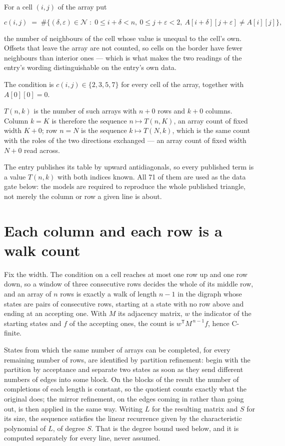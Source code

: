 \documentclass[11pt]{article}
\theoremstyle{definition}
\begin{document}
For a cell $(i,j)$ of the array put

\[c(i,j) \;=\; \#\bigl\{(\delta,\varepsilon)\in\mathcal{N} \;:\; 0\le i+\delta<n,\ 0\le j+\varepsilon<2,\ A[i+\delta][j+\varepsilon] \neq A[i][j]\bigr\},\]

the number of neighbours of the cell whose value is unequal to the cell's own. Offsets that leave the array are not counted, so cells on the border have fewer neighbours than interior ones --- which is what makes the two readings of the entry's wording distinguishable on the entry's own data.

The condition is $c(i,j) \in \{2, 3, 5, 7\}$ for every cell of the array, together with $A[0][0]=0$.

$T(n,k)$ is the number of such arrays with $n + 0$ rows and $k + 0$ columns. Column $k = K$ is therefore the sequence $n \mapsto T(n,K)$, an array count of fixed width $K + 0$; row $n = N$ is the sequence $k \mapsto T(N,k)$, which is the same count with the roles of the two directions exchanged --- an array count of fixed width $N + 0$ read across.

The entry publishes its table by upward antidiagonals, so every published term is a value $T(n,k)$ with both indices known. All 71 of them are used as the data gate below: the models are required to reproduce the whole published triangle, not merely the column or row a given line is about.

\section{Each column and each row is a walk count}

Fix the width. The condition on a cell reaches at most one row up and one row down, so a window of three consecutive rows decides the whole of its middle row, and an array of $n$ rows is exactly a walk of length $n-1$ in the digraph whose states are pairs of consecutive rows, starting at a state with no row above and ending at an accepting one. With $M$ its adjacency matrix, $w$ the indicator of the starting states and $f$ of the accepting ones, the count is $w^{\mathsf T}M^{\,n-1}f$, hence C-finite.

States from which the same number of arrays can be completed, for every remaining number of rows, are identified by partition refinement: begin with the partition by acceptance and separate two states as soon as they send different numbers of edges into some block. On the blocks of the result the number of completions of each length is constant, so the quotient counts exactly what the original does; the mirror refinement, on the edges coming in rather than going out, is then applied in the same way. Writing $L$ for the resulting matrix and $S$ for its size, the sequence satisfies the linear recurrence given by the characteristic polynomial of $L$, of degree $S$. That is the degree bound used below, and it is computed separately for every line, never assumed.
\end{document}
